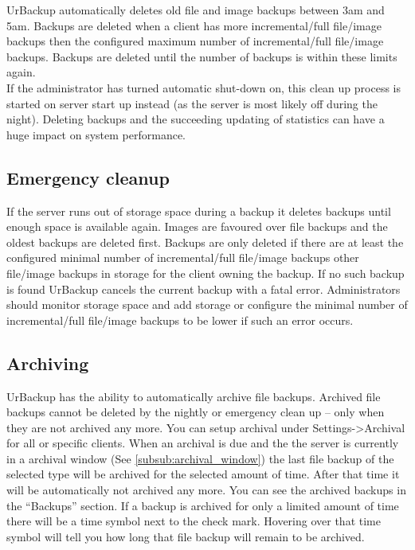 \documentclass[a4paper,10pt]{article} \usepackage[breaklinks=true]{hyperref}
\begin{document}
UrBackup automatically deletes old file and image backups between 3am and 5am. Backups are deleted when a client has more incremental/full file/image backups then the configured maximum number of incremental/full file/image backups. Backups are deleted until the number of backups is within these limits again.\\
If the administrator has turned automatic shut-down on, this clean up process is started on server start up instead (as the server is most likely off during the night). Deleting backups and the succeeding updating of statistics can have a huge impact on system performance.

\subsection{Emergency cleanup}

If the server runs out of storage space during a backup it deletes backups until enough space is available again. Images are favoured over file backups and the oldest backups are deleted first. Backups are only deleted if there are at least the configured minimal number of incremental/full file/image backups other file/image backups in storage for the client owning the backup. If no such backup is found UrBackup cancels the current backup with a fatal error. Administrators should monitor storage space and add storage or configure the minimal number of incremental/full file/image backups to be lower if such an error occurs.

\subsection{Archiving}
\label{subsec:archiving}

UrBackup has the ability to automatically archive file backups. Archived file backups
cannot be deleted by the nightly or emergency clean up -- only when they are not archived
any more. You can setup archival under Settings->Archival for all or specific clients.
When an archival is due and the the server is currently in a archival window (See \ref{subsub:archival_window})
the last file backup of the selected type will be archived for the selected amount of time.
After that time it will be automatically not archived any more. You can see the archived backups
in the ``Backups'' section. If a backup is archived for only a limited amount of time there
will be a time symbol next to the check mark. Hovering over that time symbol will tell you
how long that file backup will remain to be archived.
\end{document}
